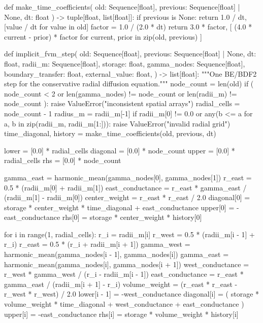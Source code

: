 \documentclass[withoutpreface,bwprint]{cumcmthesis}
\begin{document}
\begin{PythonCode}
def make_time_coefficients(
    old: Sequence[float], previous: Sequence[float] | None, dt: float
) -> tuple[float, list[float]]:
    if previous is None:
        return 1.0 / dt, [value / dt for value in old]
    factor = 1.0 / (2.0 * dt)
    return 3.0 * factor, [
        (4.0 * current - prior) * factor
        for current, prior in zip(old, previous)
    ]


def implicit_fvm_step(
    old: Sequence[float],
    previous: Sequence[float] | None,
    dt: float,
    radii_m: Sequence[float],
    storage: float,
    gamma_nodes: Sequence[float],
    boundary_transfer: float,
    external_value: float,
) -> list[float]:
    """One BE/BDF2 step for the conservative radial diffusion equation."""
    node_count = len(old)
    if (
        node_count < 2
        or len(gamma_nodes) != node_count
        or len(radii_m) != node_count
    ):
        raise ValueError("inconsistent spatial arrays")
    radial_cells = node_count - 1
    radius_m = radii_m[-1]
    if radii_m[0] != 0.0 or any(b <= a for a, b in zip(radii_m, radii_m[1:])):
        raise ValueError("invalid radial grid")
    time_diagonal, history = make_time_coefficients(old, previous, dt)

    lower = [0.0] * radial_cells
    diagonal = [0.0] * node_count
    upper = [0.0] * radial_cells
    rhs = [0.0] * node_count

    gamma_east = harmonic_mean(gamma_nodes[0], gamma_nodes[1])
    r_east = 0.5 * (radii_m[0] + radii_m[1])
    east_conductance = r_east * gamma_east / (radii_m[1] - radii_m[0])
    center_weight = r_east * r_east / 2.0
    diagonal[0] = storage * center_weight * time_diagonal + east_conductance
    upper[0] = -east_conductance
    rhs[0] = storage * center_weight * history[0]

    for i in range(1, radial_cells):
        r_i = radii_m[i]
        r_west = 0.5 * (radii_m[i - 1] + r_i)
        r_east = 0.5 * (r_i + radii_m[i + 1])
        gamma_west = harmonic_mean(gamma_nodes[i - 1], gamma_nodes[i])
        gamma_east = harmonic_mean(gamma_nodes[i], gamma_nodes[i + 1])
        west_conductance = r_west * gamma_west / (r_i - radii_m[i - 1])
        east_conductance = r_east * gamma_east / (radii_m[i + 1] - r_i)
        volume_weight = (r_east * r_east - r_west * r_west) / 2.0
        lower[i - 1] = -west_conductance
        diagonal[i] = (
            storage * volume_weight * time_diagonal
            + west_conductance
            + east_conductance
        )
        upper[i] = -east_conductance
        rhs[i] = storage * volume_weight * history[i]


\end{PythonCode}
\end{document}
